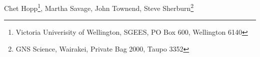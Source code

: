 Chet Hopp\footnote{Victoria Univerisity of Wellington, SGEES, PO Box 600, Wellington 6140}, Martha Savage\footnotemark[1], John Townend\footnotemark[1], Steve Sherburn\footnote{GNS Science, Wairakei, Private Bag 2000, Taupo 3352}